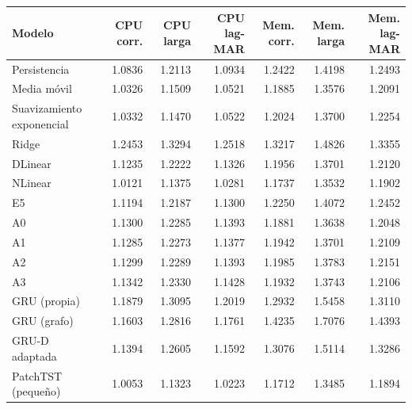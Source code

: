 \begin{tabular}{lrrrrrr}
\toprule
Modelo & CPU corr. & CPU larga & CPU lag-MAR & Mem. corr. & Mem. larga & Mem. lag-MAR \\
\midrule
Persistencia & 1.0836 & 1.2113 & 1.0934 & 1.2422 & 1.4198 & 1.2493 \\
Media móvil & 1.0326 & 1.1509 & 1.0521 & 1.1885 & 1.3576 & 1.2091 \\
Suavizamiento exponencial & 1.0332 & 1.1470 & 1.0522 & 1.2024 & 1.3700 & 1.2254 \\
Ridge & 1.2453 & 1.3294 & 1.2518 & 1.3217 & 1.4826 & 1.3355 \\
DLinear & 1.1235 & 1.2222 & 1.1326 & 1.1956 & 1.3701 & 1.2120 \\
NLinear & 1.0121 & 1.1375 & 1.0281 & 1.1737 & 1.3532 & 1.1902 \\
E5 & 1.1194 & 1.2187 & 1.1300 & 1.2250 & 1.4072 & 1.2452 \\
A0 & 1.1300 & 1.2285 & 1.1393 & 1.1881 & 1.3638 & 1.2048 \\
A1 & 1.1285 & 1.2273 & 1.1377 & 1.1942 & 1.3701 & 1.2109 \\
A2 & 1.1299 & 1.2289 & 1.1393 & 1.1985 & 1.3783 & 1.2151 \\
A3 & 1.1342 & 1.2330 & 1.1428 & 1.1932 & 1.3743 & 1.2106 \\
GRU (propia) & 1.1879 & 1.3095 & 1.2019 & 1.2932 & 1.5458 & 1.3110 \\
GRU (grafo) & 1.1603 & 1.2816 & 1.1761 & 1.4235 & 1.7076 & 1.4393 \\
GRU-D adaptada & 1.1394 & 1.2605 & 1.1592 & 1.3076 & 1.5114 & 1.3286 \\
PatchTST (pequeño) & 1.0053 & 1.1323 & 1.0223 & 1.1712 & 1.3485 & 1.1894 \\
\bottomrule
\end{tabular}
